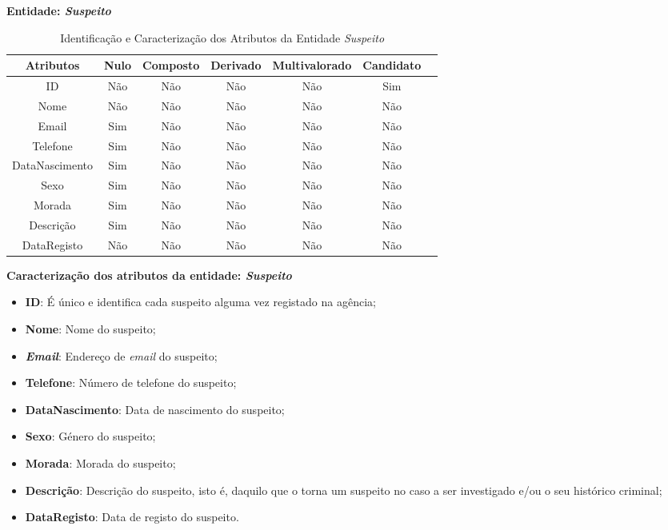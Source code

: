 \documentclass[a4paper,12pt]{scrreprt}
\newcommand{\Nao}{%
    \cellcolor{red!40}Não
}
\newcommand{\Sim}{%
    \cellcolor{green!40}Sim
}
\begin{document}
        \pagebreak
        \textbf{Entidade: \textit{Suspeito}}
        \begin{table}[!ht]
        \centering
        \begin{tabular}{|c|c|c|c|c|c|c|}
        \hline
        \rowcolor{gray!20!white}
        \textbf{Atributos} & \textbf{Nulo} & \textbf{Composto} & \textbf{Derivado} & \textbf{Multivalorado} & \textbf{Candidato} \\
        \hline
        ID                  & \Nao & \Nao & \Nao & \Nao & \Sim \\
        Nome                & \Nao & \Nao & \Nao & \Nao & \Nao \\  
        Email               & \Sim & \Nao & \Nao & \Nao & \Nao \\
        Telefone            & \Sim & \Nao & \Nao & \Nao & \Nao \\
        DataNascimento      & \Sim & \Nao & \Nao & \Nao & \Nao \\
        Sexo                & \Sim & \Nao & \Nao & \Nao & \Nao \\
        Morada              & \Sim & \Nao & \Nao & \Nao & \Nao \\
        Descrição           & \Sim & \Nao & \Nao & \Nao & \Nao \\
        DataRegisto         & \Nao & \Nao & \Nao & \Nao & \Nao \\
        \hline
        \end{tabular}
        \caption{Identificação e Caracterização dos Atributos da Entidade \textit{Suspeito}}
        \end{table}

        \textbf{Caracterização dos atributos da entidade: \textit{Suspeito}}
        \begin{itemize}
            \item \textbf{ID}: É único e identifica cada suspeito alguma vez registado na agência;
            \item \textbf{Nome}: Nome do suspeito;
            \item \textbf{\textit{Email}}: Endereço de \textit{email} do suspeito;
            \item \textbf{Telefone}: Número de telefone do suspeito;
            \item \textbf{DataNascimento}: Data de nascimento do suspeito;
            \item \textbf{Sexo}: Género do suspeito;
            \item \textbf{Morada}: Morada do suspeito;
            \item \textbf{Descrição}: Descrição do suspeito, isto é, daquilo que o torna um suspeito no caso a ser investigado e/ou o seu histórico criminal;
            \item \textbf{DataRegisto}: Data de registo do suspeito.
        \end{itemize}
\end{document}
